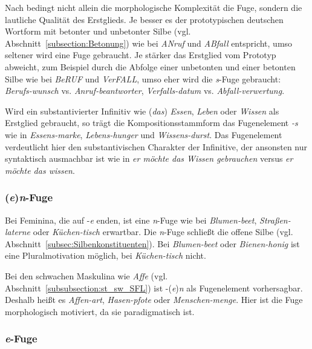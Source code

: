 Nach \citet[217]{NueblingSzczep2010} bedingt nicht allein die morphologische Komplexität die Fuge, sondern die lautliche Qualität des Erstglieds. Je besser es der prototypischen deutschen Wortform mit betonter und unbetonter Silbe (vgl. Abschnitt~\ref{subsection:Betonung}) wie bei \textit{ANruf} und \textit{ABfall} entspricht, umso seltener wird eine Fuge gebraucht. Je stärker das Erstglied vom Prototyp abweicht, zum Beispiel durch die Abfolge einer unbetonten und einer betonten Silbe wie bei \textit{BeRUF} und \textit{VerFALL}, umso eher wird die \textit{s}-Fuge gebraucht: \textit{Berufs-wunsch} vs. \textit{Anruf-beantworter}, \textit{Verfalls-datum} vs. \textit{Abfall-verwertung}. 

Wird ein substantivierter Infinitiv wie (\textit{das}) \textit{Essen}, \textit{Leben} oder \textit{Wissen} als Erstglied gebraucht, so trägt die Kompositionsstammform das Fugenelement \textit{-s} wie in \textit{Essens-marke}, \textit{Lebens-hunger} und \textit{Wissens-durst}. Das Fugenelement verdeutlicht hier den substantivischen Charakter der Infinitive, der ansonsten nur syntaktisch ausmachbar ist wie in \textit{er möchte das Wissen gebrauchen} versus \textit{er möchte das wissen}.


\subsubsection{(\textit{e})\textit{n}-Fuge}\label{subsubsection:n-Fuge}

Bei Feminina, die auf -\textit{e} enden, ist eine \textit{n}-Fuge wie bei \textit{Blumen-beet}, \textit{Straßen-laterne} oder \textit{Küchen-tisch} erwartbar. Die \textit{n}-Fuge schließt die offene Silbe (vgl. Abschnitt~\ref{subsec:Silbenkonstituenten}). Bei \textit{Blumen-beet} oder \textit{Bienen-honig} ist eine Pluralmotivation möglich, bei \textit{Küchen-tisch} nicht. 

Bei den schwachen Maskulina wie \textit{Affe} (vgl. Abschnitt~\ref{subsubsection:st_sw_SFL}) ist -(\textit{e})\textit{n} als Fugenelement vorhersagbar. Deshalb heißt es \textit{Affen-art}, \textit{Hasen-pfote} oder \textit{Menschen-menge}. Hier ist die Fuge morphologisch motiviert, da sie paradigmatisch ist.



\subsubsection{\textit{e}-Fuge}\label{subsubsection:e-Fuge}

